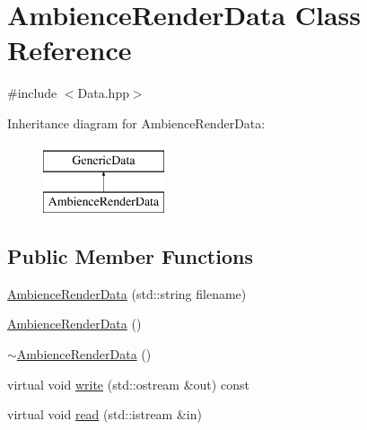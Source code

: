 \hypertarget{class_ambience_render_data}{\section{Ambience\-Render\-Data Class Reference}
\label{class_ambience_render_data}
}


{\ttfamily \#include $<$Data.\-hpp$>$}

Inheritance diagram for Ambience\-Render\-Data\-:\begin{figure}[H]
\begin{center}
\leavevmode
\includegraphics[height=2.000000cm]{class_ambience_render_data}
\end{center}
\end{figure}
\subsection*{Public Member Functions}
\begin{DoxyCompactItemize}
\item 
\hyperlink{class_ambience_render_data_a5590468febae461c201a64313f6c38be}{Ambience\-Render\-Data} (std\-::string filename)
\item 
\hyperlink{class_ambience_render_data_a5905531cc042e53c6c6730e74b8e2325}{Ambience\-Render\-Data} ()
\item 
\hyperlink{class_ambience_render_data_abf7ae51efd4286b33be9aa960dc1f228}{$\sim$\-Ambience\-Render\-Data} ()
\item 
virtual void \hyperlink{class_ambience_render_data_a04e058a2c8b174def8c381a19ede0d12}{write} (std\-::ostream \&out) const 
\item 
virtual void \hyperlink{class_ambience_render_data_a051acf84a9c31c6e439e7d7e7445ef47}{read} (std\-::istream \&in)
\end{DoxyCompactItemize}
